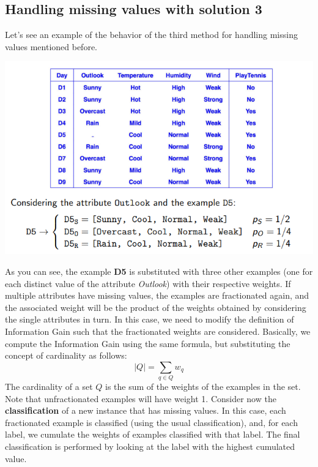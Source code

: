 \subsection{Handling missing values with solution 3}
Let's see an example of the behavior of the third method for handling missing values mentioned before.
\begin{center}
    \includegraphics[]{images/Immagine 2023-01-12 152336.png}
\end{center}
As you can see, the example \textbf{D5} is substituted with three other examples (one for each distinct value of the attribute \textit{Outlook}) with their respective weights. If multiple attributes have missing values, the examples are fractionated again, and the associated weight will be the product of the weights obtained by considering the single attributes in turn.\newline\newline
In this case, we need to modify the definition of Information Gain such that the fractionated weights are considered. Basically, we compute the Information Gain using the same formula, but substituting the concept of cardinality as follows:
\[|Q| = \sum_{q \in Q}w_{q}\]
The cardinality of a set $Q$ is the sum of the weights of the examples in the set. Note that unfractionated examples will have weight 1.\newline\newline
Consider now the \textbf{classification} of a new instance that has missing values. In this case, each fractionated example is classified (using the usual classification), and, for each label, we cumulate the weights of examples classified with that label. The final classification is performed by looking at the label with the highest cumulated value.
